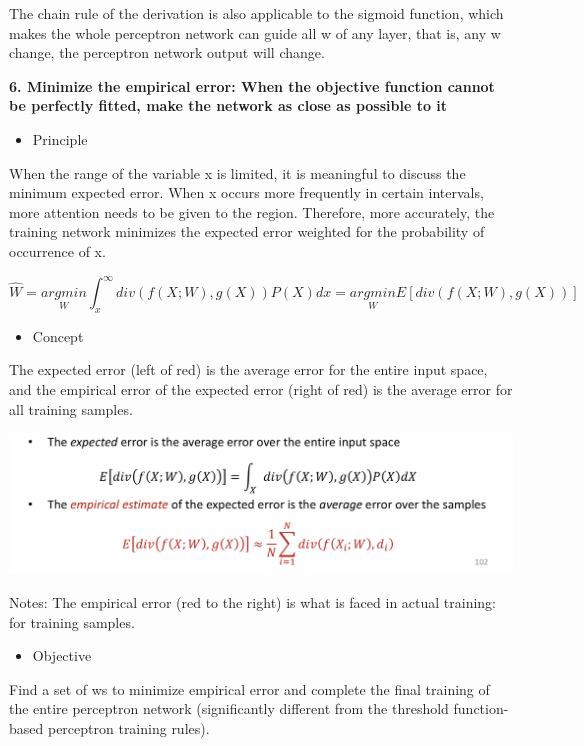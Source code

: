 \documentclass{article}
\begin{document}
	The chain rule of the derivation is also applicable to the sigmoid function, which makes the whole perceptron network can guide all w of any layer, that is, any w change, the perceptron network output will change.
	
	\textbf{6. Minimize the empirical error: When the objective function cannot be perfectly fitted, make the network as close as possible to it}
	
	\begin{itemize}
		\item Principle
	\end{itemize}
	
	
	When the range of the variable x is limited, it is meaningful to discuss the minimum expected error. When x occurs more frequently in certain intervals, more attention needs to be given to the region. Therefore, more accurately, the training network minimizes the expected error weighted for the probability of occurrence of x.
	
	$$\hat{W}=\underset{W}{argmin}\int_{x}^{\infty }div(f(X;W),g(X))P(X)dx 
	=\underset{W}{argmin}E[div(f(X;W),g(X))]$$
	
	
	\begin{itemize}
		\item Concept
	\end{itemize}
	
	
	The expected error (left of red) is the average error for the entire input space, and the empirical error of the expected error (right of red) is the average error for all training samples.
	
	\includegraphics[scale=0.2]{56.png}
	
	Notes: The empirical error (red to the right) is what is faced in actual training: for training samples.
	
	
	\begin{itemize}
		\item Objective
	\end{itemize}
	
	
	Find a set of ws to minimize empirical error and complete the final training of the entire perceptron network (significantly different from the threshold function-based perceptron training rules). \\ \\ \\
	
\end{document}
